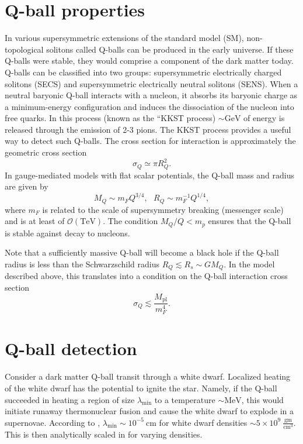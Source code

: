 \documentclass[11 pt, preprint,preprintnumbers,amsmath,amssymb, prd]{revtex4}
\newcommand{\Mpl}{M_{\text{pl}}}
\begin{document}
\section{Q-ball properties}
In various supersymmetric extensions of the standard model (SM), non-topological solitons called Q-balls can be produced in the early universe. If these Q-balls were stable, they would comprise a component of the dark matter today. Q-balls can be classified into two groups: supersymmetric electrically charged solitons (SECS) and supersymmetric electrically neutral solitons (SENS). When a neutral baryonic Q-ball interacts with a nucleon, it absorbs its baryonic charge as a minimum-energy configuration and induces the dissociation of the nucleon into free quarks. In this process (known as the ``KKST process) $\sim \text{GeV}$ of energy is released through the emission of 2-3 pions. The KKST process provides a useful way to detect such Q-balls. The cross section for interaction is approximately the geometric cross section
\begin{equation}
\sigma_Q \simeq \pi R_Q^2.
\end{equation}
In gauge-mediated models with flat scalar potentials, the Q-ball mass and radius are given by
\begin{equation}
M_Q \sim m_F Q^{3/4}, ~~~ R_Q \sim m_F^{-1} Q^{1/4},
\end{equation}
where $m_F$ is related to the scale of supersymmetry breaking (messenger scale) and is at least of $\mathcal{O}(\text{TeV})$. The condition $M_Q/Q < m_p$ ensures that the Q-ball is stable against decay to nucleons. 

Note that a sufficiently massive Q-ball will become a black hole if the Q-ball radius is less than the Schwarzschild radius $R_Q \lesssim R_s \sim G M_Q$. In the model described above, this translates into a condition on the Q-ball interaction cross section 
\begin{equation}
\sigma_Q \lesssim \frac{\Mpl}{m_F^4}. 
\end{equation}

\section{Q-ball detection}
Consider a dark matter Q-ball transit through a white dwarf. Localized heating of the white dwarf has the potential to ignite the star. Namely, if the Q-ball succeeded in heating a region of size $\lambda_\text{min}$ to a temperature $\sim \text{MeV}$, this would initiate runaway thermonuclear fusion and cause the white dwarf to explode in a supernovae. According to \cite{Woosley}, $\lambda_{\text{min}} \sim 10^{-5} ~\text{cm}$ for white dwarf densities $\sim 5 \times 10^9 ~\frac{\text{gm}}{\text{cm}^3}$. This is then analytically scaled in \cite{Varela} for varying densities. 
\end{document}
